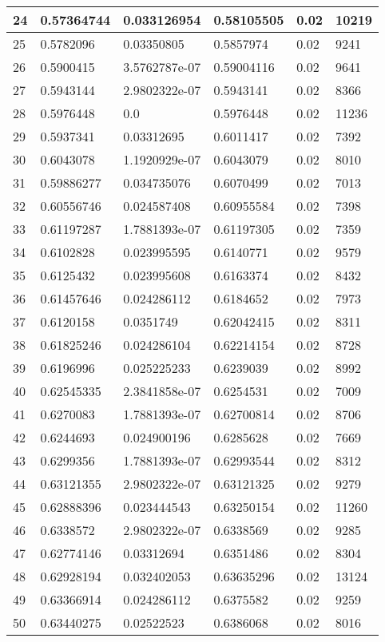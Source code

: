\begin{longtable}{|l|l|l|l|l|l|}
24 & 0.57364744 & 0.033126954 & 0.58105505 & 0.02 & 10219 \\ \hline 
25 & 0.5782096 & 0.03350805 & 0.5857974 & 0.02 & 9241 \\ \hline 
26 & 0.5900415 & 3.5762787e-07 & 0.59004116 & 0.02 & 9641 \\ \hline 
27 & 0.5943144 & 2.9802322e-07 & 0.5943141 & 0.02 & 8366 \\ \hline 
28 & 0.5976448 & 0.0 & 0.5976448 & 0.02 & 11236 \\ \hline 
29 & 0.5937341 & 0.03312695 & 0.6011417 & 0.02 & 7392 \\ \hline 
30 & 0.6043078 & 1.1920929e-07 & 0.6043079 & 0.02 & 8010 \\ \hline 
31 & 0.59886277 & 0.034735076 & 0.6070499 & 0.02 & 7013 \\ \hline 
32 & 0.60556746 & 0.024587408 & 0.60955584 & 0.02 & 7398 \\ \hline 
33 & 0.61197287 & 1.7881393e-07 & 0.61197305 & 0.02 & 7359 \\ \hline 
34 & 0.6102828 & 0.023995595 & 0.6140771 & 0.02 & 9579 \\ \hline 
35 & 0.6125432 & 0.023995608 & 0.6163374 & 0.02 & 8432 \\ \hline 
36 & 0.61457646 & 0.024286112 & 0.6184652 & 0.02 & 7973 \\ \hline 
37 & 0.6120158 & 0.0351749 & 0.62042415 & 0.02 & 8311 \\ \hline 
38 & 0.61825246 & 0.024286104 & 0.62214154 & 0.02 & 8728 \\ \hline 
39 & 0.6196996 & 0.025225233 & 0.6239039 & 0.02 & 8992 \\ \hline 
40 & 0.62545335 & 2.3841858e-07 & 0.6254531 & 0.02 & 7009 \\ \hline 
41 & 0.6270083 & 1.7881393e-07 & 0.62700814 & 0.02 & 8706 \\ \hline 
42 & 0.6244693 & 0.024900196 & 0.6285628 & 0.02 & 7669 \\ \hline 
43 & 0.6299356 & 1.7881393e-07 & 0.62993544 & 0.02 & 8312 \\ \hline 
44 & 0.63121355 & 2.9802322e-07 & 0.63121325 & 0.02 & 9279 \\ \hline 
45 & 0.62888396 & 0.023444543 & 0.63250154 & 0.02 & 11260 \\ \hline 
46 & 0.6338572 & 2.9802322e-07 & 0.6338569 & 0.02 & 9285 \\ \hline 
47 & 0.62774146 & 0.03312694 & 0.6351486 & 0.02 & 8304 \\ \hline 
48 & 0.62928194 & 0.032402053 & 0.63635296 & 0.02 & 13124 \\ \hline 
49 & 0.63366914 & 0.024286112 & 0.6375582 & 0.02 & 9259 \\ \hline 
50 & 0.63440275 & 0.02522523 & 0.6386068 & 0.02 & 8016 \\ \hline 
\end{longtable}